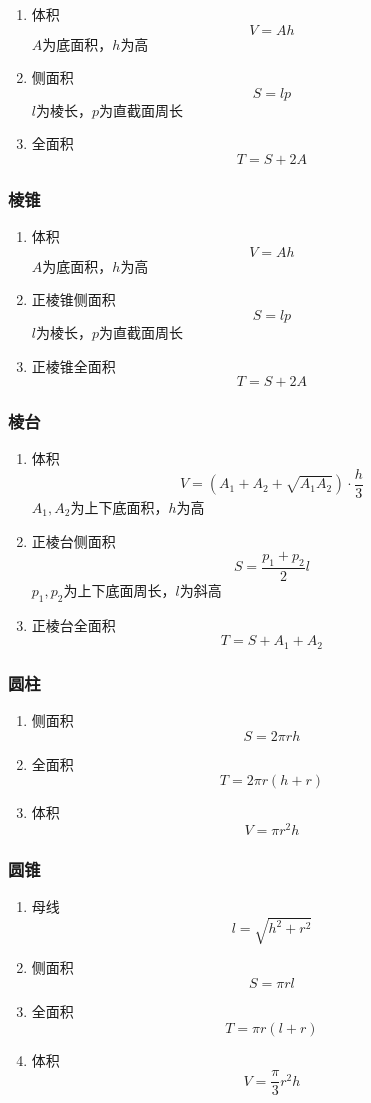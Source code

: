 \documentclass[a4paper]{article}
\begin{document}
\begin{enumerate}
	\item 体积
		$$V=Ah$$
		$A$为底面积，$h$为高
	\item 侧面积
		$$S=lp$$
		$l$为棱长，$p$为直截面周长
	\item 全面积
		$$T=S+2A$$
\end{enumerate}

\subsubsection{棱锥}

\begin{enumerate}
	\item 体积
		$$V=Ah$$
		$A$为底面积，$h$为高
	\item 正棱锥侧面积
		$$S=lp$$
		$l$为棱长，$p$为直截面周长
	\item 正棱锥全面积
		$$T=S+2A$$
\end{enumerate}

\subsubsection{棱台}

\begin{enumerate}
	\item 体积
		$$V=(A_1+A_2+\sqrt{A_1A_2}) \cdot \frac{h}{3}$$
		$A_1,A_2$为上下底面积，$h$为高
	\item 正棱台侧面积
		$$S=\frac{p_1+p_2}{2}l$$
		$p_1,p_2$为上下底面周长，$l$为斜高
	\item 正棱台全面积
		$$T=S+A_1+A_2$$
\end{enumerate}

\subsubsection{圆柱}

\begin{enumerate}
	\item 侧面积
		$$S=2\pi rh$$
	\item 全面积
		$$T=2\pi r(h+r)$$
	\item 体积
		$$V=\pi r^2h$$
\end{enumerate}

\subsubsection{圆锥}

\begin{enumerate}
	\item 母线
		$$l=\sqrt{h^2+r^2}$$
	\item 侧面积
		$$S=\pi rl$$
	\item 全面积
		$$T=\pi r(l+r)$$
	\item 体积
		$$V=\frac{\pi}{3} r^2h$$
\end{enumerate}
\end{document}
